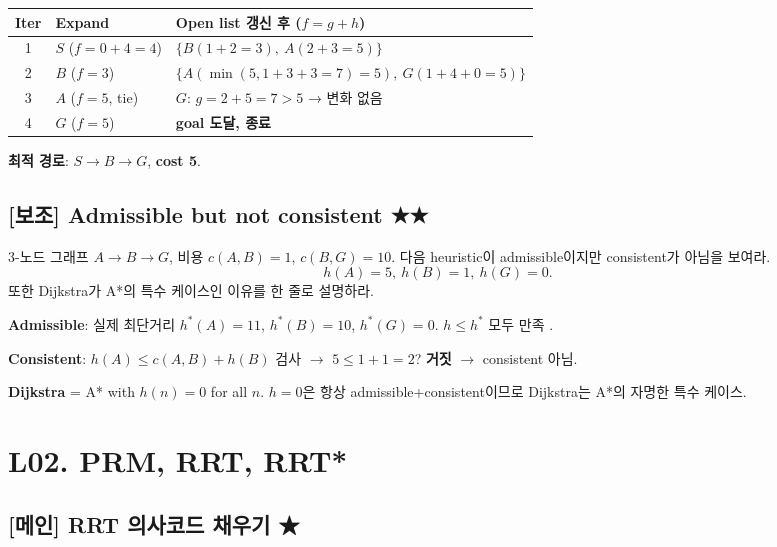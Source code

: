 \documentclass[11pt,a4paper]{article}
\begin{document}
\begin{sol}
\begin{center}
\small
\begin{tabular}{cll}
\toprule
Iter & Expand & Open list 갱신 후 ($f = g + h$) \\
\midrule
1 & $S$ ($f = 0+4 = 4$) & $\{B(1+2 = 3),\ A(2+3 = 5)\}$ \\
2 & $B$ ($f = 3$)       & $\{A(\min(5, 1+3+3 = 7) = 5),\ G(1+4+0 = 5)\}$ \\
3 & $A$ ($f = 5$, tie)  & $G$: $g = 2+5 = 7 > 5$ → 변화 없음 \\
4 & $G$ ($f = 5$)       & \textbf{goal 도달, 종료} \\
\bottomrule
\end{tabular}
\end{center}

\textbf{최적 경로}: $S \to B \to G$, \textbf{cost 5}.
\end{sol}

\subsection*{[보조] Admissible but not consistent \hfill ★★}

\begin{prob}
3-노드 그래프 $A \to B \to G$, 비용 $c(A, B) = 1$, $c(B, G) = 10$. 다음 heuristic이 admissible이지만 consistent가 아님을 보여라.
\[
h(A) = 5,\ h(B) = 1,\ h(G) = 0.
\]
또한 Dijkstra가 A*의 특수 케이스인 이유를 한 줄로 설명하라.
\end{prob}

\begin{sol}
\textbf{Admissible}: 실제 최단거리 $h^*(A) = 11$, $h^*(B) = 10$, $h^*(G) = 0$. $h \le h^*$ 모두 만족 \checkmark.

\textbf{Consistent}: $h(A) \le c(A, B) + h(B)$ 검사 $\to$ $5 \le 1 + 1 = 2$? \textbf{거짓} $\to$ consistent 아님.

\textbf{Dijkstra} = A* with $h(n) = 0$ for all $n$. $h = 0$은 항상 admissible+consistent이므로 Dijkstra는 A*의 자명한 특수 케이스.
\end{sol}

\section{L02. PRM, RRT, RRT*}

\subsection*{[메인] RRT 의사코드 채우기 \hfill ★}
\end{document}
